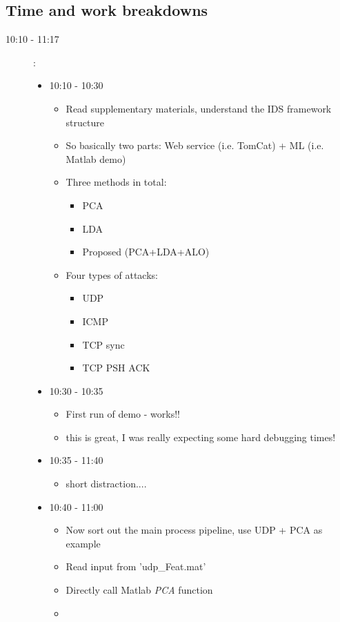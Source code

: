 \documentclass[a4paper]{article}
\begin{document}
\subsection{Time and work breakdowns}
\begin{description}
	\item [10:10 - 11:17]:
	\begin{itemize}
		\item 10:10 - 10:30 
			\begin{itemize}
				\item Read supplementary materials, understand the IDS framework structure
				\item So basically two parts: Web service (i.e. TomCat) + ML (i.e. Matlab demo)
				\item Three methods in total:
					\begin{itemize}
						\item PCA
						\item LDA
						\item Proposed (PCA+LDA+ALO)
					\end{itemize}

				\item Four types of attacks:
					\begin{itemize}
						\item UDP
						\item ICMP
						\item TCP sync
						\item TCP PSH ACK
					\end{itemize}
			\end{itemize}
			
		\item 10:30 - 10:35
			\begin{itemize}
				\item First run of demo - works!! 
				\item this is great, I was really expecting some hard debugging times!
			\end{itemize}
		\item 10:35 - 11:40
			\begin{itemize}
				\item short distraction....
			\end{itemize}
		\item 10:40 - 11:00
			\begin{itemize}
				\item Now sort out the main process pipeline, use UDP + PCA as example
				\item Read input from 'udp\_Feat.mat'
				\item Directly call Matlab \textit{PCA} function
				\item 
			\end{itemize}
	\end{itemize}
	

\end{description}
\end{document}
